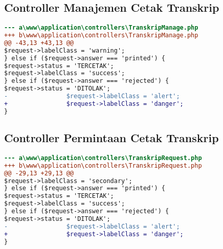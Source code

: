 \subsection{Controller Manajemen Cetak Transkrip}
\begin{lstlisting}[language=diff, caption=Controller Manajemen Cetak Transkrip, label=Entri, basicstyle=\ttfamily, frame=single,
columns=fullflexible, keepspaces=true, breaklines=true]
--- a\www\application\controllers\TranskripManage.php
+++ b\www\application\controllers\TranskripManage.php
@@ -43,13 +43,13 @@
$request->labelClass = 'warning';
} else if ($request->answer === 'printed') {
$request->status = 'TERCETAK';
$request->labelClass = 'success';
} else if ($request->answer === 'rejected') {
$request->status = 'DITOLAK';
-                $request->labelClass = 'alert';
+                $request->labelClass = 'danger';
}
\end{lstlisting}

\subsection{Controller Permintaan Cetak Transkrip}
\begin{lstlisting}[language=diff, caption=Controller Request Cetak Transkrip, label=Entri, basicstyle=\ttfamily, frame=single,
columns=fullflexible, keepspaces=true, breaklines=true]
--- a\www\application\controllers\TranskripRequest.php	
+++ b\www\application\controllers\TranskripRequest.php	
@@ -29,13 +29,13 @@
$request->labelClass = 'secondary';
} else if ($request->answer === 'printed') {
$request->status = 'TERCETAK';
$request->labelClass = 'success';
} else if ($request->answer === 'rejected') {
$request->status = 'DITOLAK';
-                $request->labelClass = 'alert';
+                $request->labelClass = 'danger';
}
\end{lstlisting}